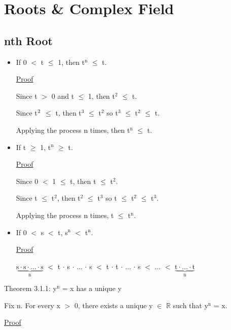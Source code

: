 \newpage
\section[Day 3: Roots and the Complex Field]{Roots \& Complex Field}

\subsection{nth Root}

	\begin{itemize}[leftmargin=1cm]
		\item If 0 $<$ t $\leq$ 1, then t$^\text{n}$ $ \leq $ t.

			{ \color{magenta} \underline{Proof} } 
		
				Since t $>$ 0 and t $\leq$ 1, then t$^\text{2}$ $\leq$ t.

				Since t$^\text2{}$ $\leq$ t, then t$^\text{3}$ $\leq$ t$^\text{2}$
				so t$^\text{3}$ $\leq$ t$^\text{2}$ $\leq$ t.

				Applying the process n times, then t$^\text{n}$ $\leq$ t.

		\item If t $\geq$ 1, t$^\text{n}$ $ \geq $ t.

			{ \color{magenta} \underline{Proof} } 
		
				Since 0 $<$ 1 $\leq$ t, then t $\leq$ t$^\text{2}$.

				Since t $\leq$ t$^\text{2}$, then t$^\text{2}$ $\leq$ t$^\text{3}$
				so t $\leq$ t$^\text{2}$ $\leq$ t$^\text{3}$.

				Applying the process n times, t $\leq$ t$^\text{n}$.

		\item If 0 $<$ s $<$ t, s$^\text{n}$ $<$ t$^\text{n}$.

			{ \color{magenta} \underline{Proof} } 
		
				$\underbrace{\text{s} \cdot \text{s} \cdot ... \cdot \text{s}}_\text{n}$
				$<$ t $\cdot$ s $\cdot$ ... $\cdot$ s
				$<$ t $\cdot$ t $\cdot$ ... $\cdot$ s $<$ ... $<$
				$\underbrace{\text{t} \cdot ... \cdot \text{t}}_\text{n}$
	\end{itemize}


{ \color{red} Theorem 3.1.1: y$^\text{n}$ = x has a unique y }

	\qquad Fix n. For every x $>$ 0, there exists a unique y $\in$ $ \mathbb{R} $ such that
		y$^\text{n}$ = x.

{ \color{magenta} \underline{Proof} } 

